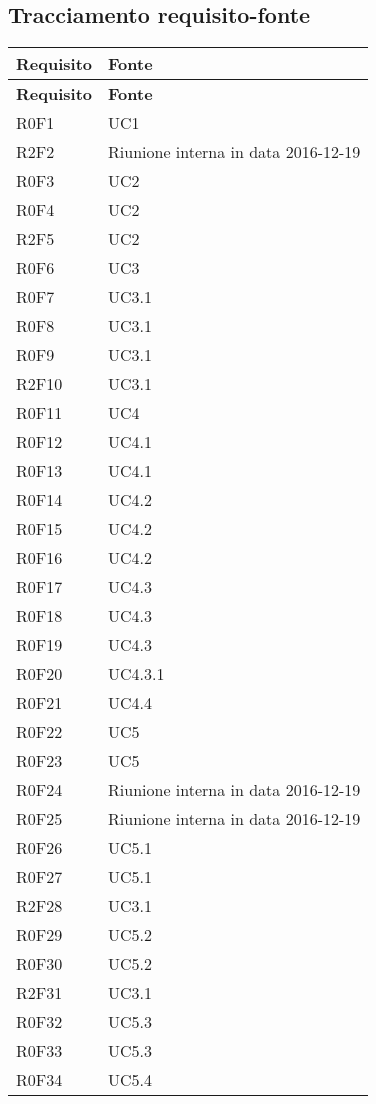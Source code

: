 \documentclass[../AnalisiDeiRequisiti.tex]{subfiles}
\begin{document}
\subsection{Tracciamento requisito-fonte}
\def\arraystretch{1.5}
\begin{longtable}{p{4cm}!{\VRule[1pt]}p{4cm}}
\color{white} \textbf{Requisito} & \color{white} \textbf{Fonte} \\ 
\endfirsthead 
{} 
\color{white} \textbf{Requisito} & \color{white} \textbf{Fonte} \\ 
\endhead 
R0F1 & UC1 \\
R2F2 & Riunione interna in data 2016-12-19 \\
R0F3 & UC2 \\
R0F4 & UC2 \\
R2F5 & UC2 \\
R0F6 & UC3 \\
R0F7 & UC3.1 \\
R0F8 & UC3.1 \\
R0F9 & UC3.1 \\
R2F10 & UC3.1 \\
R0F11 & UC4 \\
R0F12 & UC4.1 \\
R0F13 & UC4.1 \\
R0F14 & UC4.2 \\
R0F15 & UC4.2 \\
R0F16 & UC4.2 \\
R0F17 & UC4.3 \\
R0F18 & UC4.3 \\
R0F19 & UC4.3 \\
R0F20 & UC4.3.1 \\
R0F21 & UC4.4 \\
R0F22 & UC5 \\
R0F23 & UC5 \\
R0F24 & Riunione interna in data 2016-12-19 \\
R0F25 & Riunione interna in data 2016-12-19 \\
R0F26 & UC5.1 \\
R0F27 & UC5.1 \\
R2F28 & UC3.1 \\
R0F29 & UC5.2 \\
R0F30 & UC5.2 \\
R2F31 & UC3.1 \\
R0F32 & UC5.3 \\
R0F33 & UC5.3 \\
R0F34 & UC5.4 \\

\end{longtable}
\end{document}

